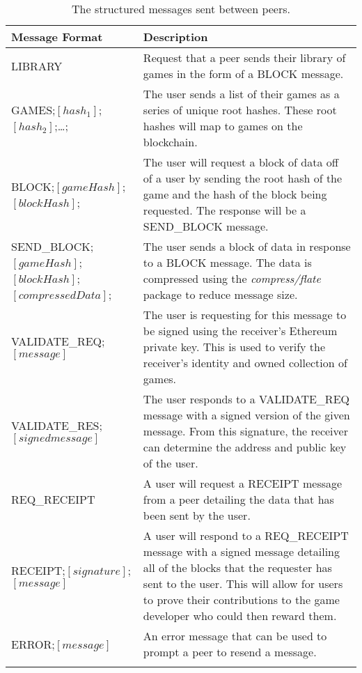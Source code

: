 \begin{longtable}{p{} p{}}
  \toprule
  \textbf{Message Format} & \textbf{Description}\\
  \midrule\midrule
  LIBRARY
  & Request that a peer sends their library of games in the form of a BLOCK message.\\
  GAMES;$[hash_1]$;$[hash_2]$;\ldots;
  & The user sends a list of their games as a series of unique root hashes. These root hashes will map to games on the blockchain.\\
  \midrule
  BLOCK;$[gameHash]$;$[blockHash]$;
  & The user will request a block of data off of a user by sending the root hash of the game and the hash of the block being requested. The response will be a SEND\_BLOCK message.\\
  SEND\_BLOCK;$[gameHash]$;\newline $[blockHash]$;$[compressedData]$;
  & The user sends a block of data in response to a BLOCK message. The data is compressed using the \textit{compress/flate} package to reduce message size.\\
  \midrule
  VALIDATE\_REQ;$[message]$
  & The user is requesting for this message to be signed using the receiver's Ethereum private key. This is used to verify the receiver's identity and owned collection of games.\\
  VALIDATE\_RES;$[signed message]$
  & The user responds to a VALIDATE\_REQ message with a signed version of the given message. From this signature, the receiver can determine the address and public key of the user.\\
  \midrule
  REQ\_RECEIPT
  & A user will request a RECEIPT message from a peer detailing the data that has been sent by the user.\\
  RECEIPT;$[signature]$;$[message]$
  & A user will respond to a REQ\_RECEIPT message with a signed message detailing all of the blocks that the requester has sent to the user. This will allow for users to prove their contributions to the game developer who could then reward them.\\
  \midrule
  ERROR;$[message]$
  & An error message that can be used to prompt a peer to resend a message.\\
  \bottomrule\bottomrule
  \caption{The structured messages sent between peers.}
\end{longtable}